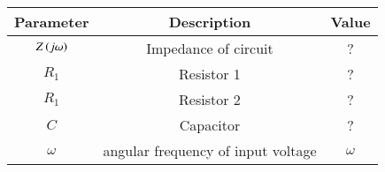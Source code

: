\begin{tabular}{|c|c|c|}
    \hline
    \textbf{Parameter} & \textbf{Description} & \textbf{Value} \\
    \hline
    $ Z\left(j\omega\right)$ & Impedance of circuit & ? \\
    \hline
    $ R_1$ & Resistor 1  &? \\
    \hline
    $ R_1$ & Resistor 2  &? \\
    \hline
    $ C$ & Capacitor  &? \\
    \hline
    $\omega$ & angular frequency of input voltage& $ \omega$\\
    \hline
\end{tabular}




